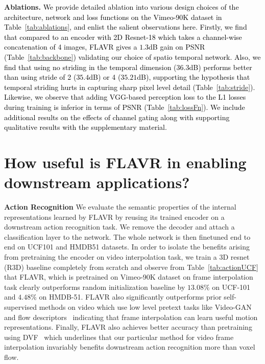 \documentclass[10pt,twocolumn,letterpaper]{article}
\newcommand{\tabref}[1]{Table~\ref{#1}}
\newcommand{\red}[1]{{#1}}
\newcommand{\Ours}{FLAVR}
\newcommand{\new}[1]{\textcolor{black}{#1}}
\begin{document}
{\bf Ablations.} \new{  We provide detailed ablation into various design choices of the architecture, network and loss functions on the Vimeo-90K dataset in \tabref{tab:ablations}, and enlist the salient observations here. Firstly, we find that compared to an encoder with 2D Resnet-18 which takes a channel-wise concatenation of 4 images, \Ours{} gives a $1.3$dB gain on PSNR (\tabref{tab:backbone}) validating our choice of spatio temporal network. Also, we find that using no striding in the temporal dimension ($36.3$dB) performs better than using stride of 2 ($35.4$dB) or 4 ($35.21$dB), supporting the hypothesis that temporal striding hurts in capturing sharp pixel level detail (\tabref{tab:stride}). Likewise, we observe that adding VGG-based perception loss \cite{johnson2016perceptual} to the L1 losses during training is inferior in terms of PSNR (\tabref{tab:lossFn}). We include additional results on the effects of channel gating along with supporting qualitative results with the \red{supplementary material}.
}

\section{How useful is \Ours{} in enabling downstream applications?}
\label{sec:SSL}

{\bf Action Recognition} We evaluate the semantic properties of the internal representations learned by \Ours{} by reusing its trained encoder on a downstream action recognition task. We remove the decoder and attach a classification layer to the network. The whole network is then finetuned end to end on UCF101 and HMDB51 datasets. In order to isolate the benefits arising from pretraining the encoder on video interpolation task, we train a 3D resnet (R3D) baseline completely from scratch and observe from \tabref{tab:actionUCF} that \Ours{}, which is pretrained on Vimeo-90K dataset on frame interpolation task clearly outperforms random initialization baseline by $13.08\%$ on UCF-101 and $4.48\%$ on HMDB-51. \Ours{} also significantly outperforms prior self-supervised methods on video which use low level pretext tasks like Video-GAN~\cite{vondrick2016generating} and flow descriptors~\cite{luo2017unsupervised} indicating that frame interpolation can learn useful motion representations. 
Finally, \Ours{} also achieves better accuracy than pretraining using DVF~\cite{liu2017video} which underlines that our particular method for video frame interpolation invariably benefits downstream action recognition more than voxel flow. 
\end{document}
